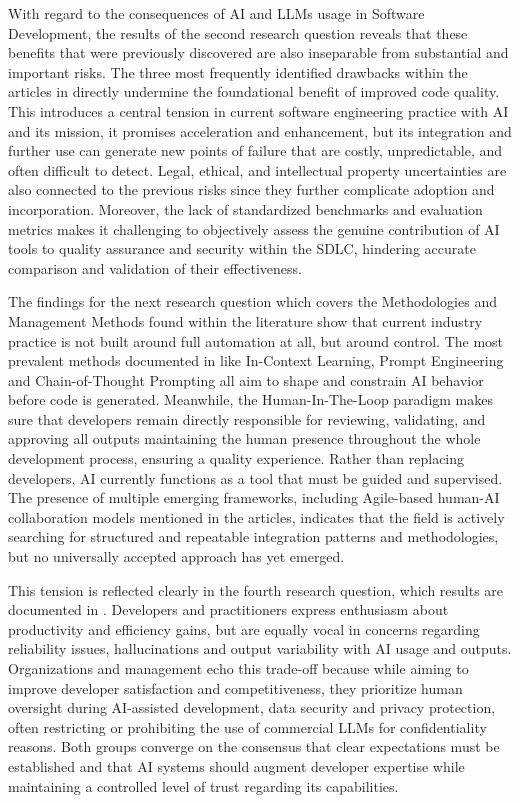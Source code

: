 With regard to the consequences of AI and LLMs usage in Software Development, the results of the second research question reveals that these benefits that were previously discovered are also inseparable from substantial and important risks. The three most frequently identified drawbacks within the articles in  directly undermine the foundational benefit of improved code quality. This introduces a central tension in current software engineering practice with AI and its mission, it promises acceleration and enhancement, but its integration and further use can generate new points of failure that are costly, unpredictable, and often difficult to detect. Legal, ethical, and intellectual property uncertainties are also connected to the previous risks since they further complicate adoption and incorporation. Moreover, the lack of standardized benchmarks and evaluation metrics makes it challenging to objectively assess the genuine contribution of AI tools to quality assurance and security within the SDLC, hindering accurate comparison and validation of their effectiveness. 

The findings for the next research question which covers the Methodologies and Management Methods found within the literature show that current industry practice is not built around full automation at all, but around control. The most prevalent methods documented in  like In-Context Learning, Prompt Engineering and Chain-of-Thought Prompting all aim to shape and constrain AI behavior before code is generated. Meanwhile, the Human-In-The-Loop paradigm makes sure that developers remain directly responsible for reviewing, validating, and approving all outputs maintaining the human presence throughout the whole development process, ensuring a quality experience. Rather than replacing developers, AI currently functions as a tool that must be guided and supervised. The presence of multiple emerging frameworks, including Agile-based human-AI collaboration models mentioned in the articles, indicates that the field is actively searching for structured and repeatable integration patterns and methodologies, but no universally accepted approach has yet emerged.

This tension is reflected clearly in the fourth research question, which results are documented in . Developers and practitioners express enthusiasm about productivity and efficiency gains, but are equally vocal in concerns regarding reliability issues, hallucinations and output variability with AI usage and outputs. Organizations and management echo this trade-off because while aiming to improve developer satisfaction and competitiveness, they prioritize human oversight during AI-assisted development, data security and privacy protection, often restricting or prohibiting the use of commercial LLMs for confidentiality reasons. Both groups converge on the consensus that clear expectations must be established and that AI systems should augment developer expertise while maintaining a controlled level of trust regarding its capabilities.


